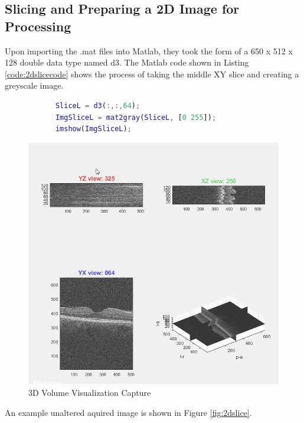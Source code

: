 \documentclass[%
reprint,
showpacs,preprintnumbers,
bibnotes,
amsmath,amssymb,
aps,
pra,
]{revtex4-1}
\begin{document}
	\subsection{\label{sec:level2} Slicing and Preparing a 2D Image for Processing}
		Upon importing the .mat files into Matlab, they took the form of a 650 x 512 x 128 double data type named d3. The Matlab code shown in Listing \ref{code:2dslicecode} shows the process of taking the middle XY slice and creating a greyscale image.
		\begin{lstlisting}[language=Matlab, caption=Take Slice of 3D Volume, label=code:2dslicecode]
			%Take Slice of 3D Volume
			SliceL = d3(:,:,64);
			ImgSliceL = mat2gray(SliceL, [0 255]);
			imshow(ImgSliceL);
		\end{lstlisting}
		\begin{figure}
			\centering
			\includegraphics[width=0.8\linewidth]{Figures/3dvol}
			\caption{3D Volume Visualization Capture}
			\label{fig:3dvol}
		\end{figure}
		An example unaltered aquired image is shown in Figure \ref{fig:2dslice}.
\end{document}
